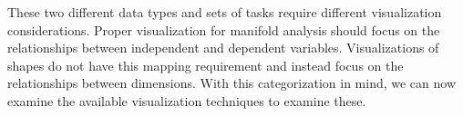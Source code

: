 These two different data types and sets of tasks require different visualization
considerations. Proper visualization for manifold analysis should focus on
the relationships between independent and dependent variables. Visualizations
of shapes do not have this mapping requirement and instead focus on the 
relationships between dimensions. With this categorization in mind, we can now
examine the available visualization techniques to examine these.

